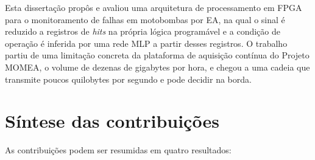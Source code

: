 
Esta dissertação propôs e avaliou uma arquitetura de processamento em FPGA para o monitoramento de falhas em motobombas por EA, na qual o sinal é reduzido a registros de \textit{hits} na própria lógica programável e a condição de operação é inferida por uma rede MLP a partir desses registros. O trabalho partiu de uma limitação concreta da plataforma de aquisição contínua do Projeto MOMEA, o volume de dezenas de gigabytes por hora, e chegou a uma cadeia que transmite poucos quilobytes por segundo e pode decidir na borda.

\section{Síntese das contribuições}

As contribuições podem ser resumidas em quatro resultados:

